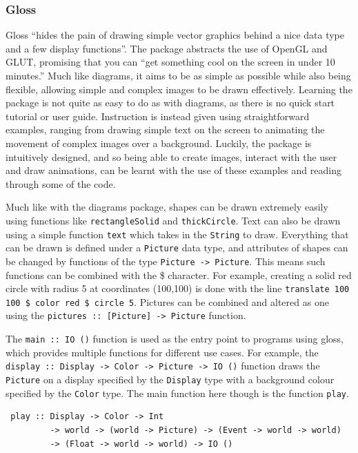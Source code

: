 \documentclass[a4paper,10pt, titlepage, twoside]{article}
\begin{document}
\subsubsection{Gloss}
Gloss \cite{gloss} ``hides the pain of drawing simple vector graphics behind a nice data type and a few display functions''. The package abstracts the use of OpenGL and GLUT, promising that you can ``get something cool on the screen in under 10 minutes.'' Much like diagrams, it aims to be as simple as possible while also being flexible, allowing simple and complex images to be drawn effectively. Learning the package is not quite as easy to do as with diagrams, as there is no quick start tutorial or user guide. Instruction is instead given using straightforward examples, ranging from drawing simple text on the screen to animating the movement of complex images over a background. Luckily, the package is intuitively designed, and so being able to create images, interact with the user and draw animations, can be learnt with the use of these examples and reading through some of the code.\par
Much like with the diagrams package, shapes can be drawn extremely easily using functions like \texttt{rectangleSolid} and \texttt{thickCircle}. Text can also be drawn using a simple function \texttt{text} which takes in the \texttt{String} to draw. Everything that can be drawn is defined under a \texttt{Picture} data type, and attributes of shapes can be changed by functions of the type \texttt{Picture -> Picture}. This means such functions can be combined with the \$ character. For example, creating a solid red circle with radius 5 at coordinates (100,100) is done with the line \texttt{translate 100 100 \$ color red \$ circle 5}. Pictures can be combined and altered as one using the \texttt{pictures :: [Picture] -> Picture} function.\par
The \texttt{main :: IO ()} function is used as the entry point to programs using gloss, which provides multiple functions for different use cases. For example, the \texttt{display :: Display -> Color -> Picture -> IO ()} function draws the \texttt{Picture} on a display specified by the \texttt{Display} type with a background colour specified by the \texttt{Color} type. The main function here though is the function \texttt{play}.
\begin{verbatim}
 play :: Display -> Color -> Int 
         -> world -> (world -> Picture) -> (Event -> world -> world) 
         -> (Float -> world -> world) -> IO ()
\end{verbatim}
\end{document}

